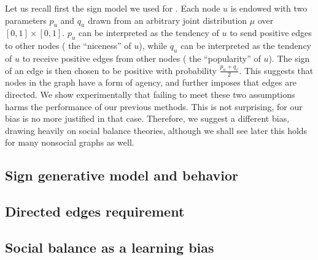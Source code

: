 Let us recall first the sign model we used for \dssn{}. Each node $u$ is endowed with two parameters
$p_u$ and $q_u$ drawn from an arbitrary joint distribution $\mu$ over $[0,1]\times [0,1]$. $p_u$ can be
interpreted as the tendency of $u$ to send positive edges to other nodes (\ie{} the
\enquote{niceness} of $u$), while $q_u$ can be interpreted as the tendency of $u$ to receive positive
edges from other nodes (\ie{} the \enquote{popularity} of $u$). The sign of an edge \euv{} is then
chosen to be positive with probability $\frac{p_u+q_v}{2}$. This suggests that nodes in the
graph have a form of agency, and further imposes that edges are directed. We show experimentally that
failing to meet these two assumptions harms the performance of our previous methods. This is not
surprising, for our bias is no more justified in that case. Therefore, we suggest a different bias,
drawing heavily on social balance theories, although we shall see later this holds for many
nonsocial graphs as well.

\subsection{Sign generative model and behavior}
\label{sub:bias_sign_behavior}



\subsection{Directed edges requirement}
\label{sub:need_for_a_directed_graph}



\subsection{Social balance as a learning bias}
\label{sub:bias_balance}


